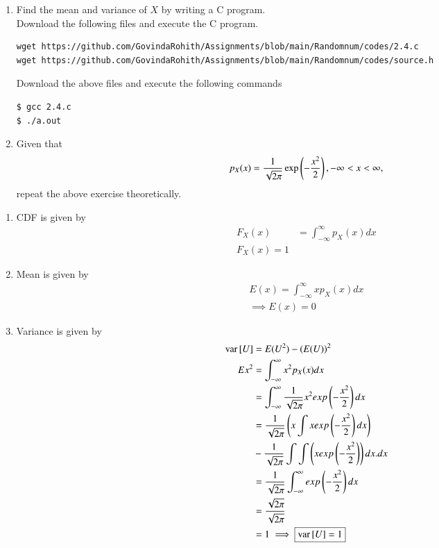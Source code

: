 \documentclass[journal,12pt,twocolumn]{IEEEtran}
\renewcommand\thesection{\arabic{section}}
\begin{document}
\begin{enumerate}[label=\thesection.\arabic*
,ref=\thesection.\theenumi]
\begin{enumerate}
    \item Decreasing function for $x>\mu$ and increasing for $x<\mu$ and attains maximum at $x=\mu$
    \item Area under the curve is unity.
\end{enumerate}
\item Find the mean and variance of $X$ by writing a C program.\\
\solution Download the following files and execute the  C program.
\begin{lstlisting}
wget https://github.com/GovindaRohith/Assignments/blob/main/Randomnum/codes/2.4.c
wget https://github.com/GovindaRohith/Assignments/blob/main/Randomnum/codes/source.h
\end{lstlisting}
Download the above files and execute the following commands
\begin{lstlisting}
$ gcc 2.4.c
$ ./a.out
\end{lstlisting}
\item Given that 
\begin{align}
p_{X}(x) = \frac{1}{\sqrt{2\pi}}\exp\left(-\frac{x^2}{2}\right), -\infty < x < \infty,
\end{align}
repeat the above exercise theoretically.
\end{enumerate}
\solution 
\begin{enumerate}
    \item CDF is given by 
    \begin{align}
        F_X(x)&=\int_{-\infty}^{\infty}p_X(x)dx\\
        \boxed{F_X(x)=1}
    \end{align}
    \item Mean is given by
    \begin{align}
        E(x)=\int_{-\infty}^{\infty}xp_X(x)dx\\
        \implies \boxed{E(x)=0}
    \end{align}
    \item Variance is given by
    \begin{align}
        \text{var}{}\left[U\right]&=E(U^2)-(E(U))^2\\
E{x^2}&=\int_{-\infty}^{\infty}x^2p_X(x)dx \\
&=\int_{-\infty}^{\infty}\frac{1}{\sqrt{2\pi}}x^2exp\left(-\frac{x^2}{2}\right)dx \\
&=\frac{1}{\sqrt{2\pi}}\left(x\int x exp\left(-\frac{x^2}{2}\right)dx\right)
\\ &-\frac{1}{\sqrt{2\pi}}\int \int \left(x exp\left(-\frac{x^2}{2}\right)\right)dx. dx\\
&=\frac{1}{\sqrt{2\pi}}\int_{-\infty}^{\infty}exp\left(-\frac{x^2}{2}\right)dx \\
&=\frac{\sqrt{2\pi}}{\sqrt{2\pi}}\\&=1
        \implies\boxed{\text{var}{}\left[U\right]=1}
    \end{align}
\end{enumerate}
\end{document}

